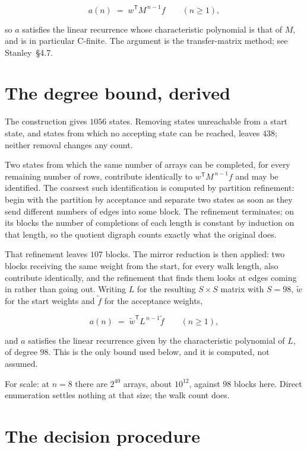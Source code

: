 \documentclass[11pt]{article}
\theoremstyle{definition}
\begin{document}
\[a(n) \;=\; w^{\mathsf T} M^{\,n-1} f \qquad (n \ge 1),\]

so $a$ satisfies the linear recurrence whose characteristic polynomial is that of $M$, and is in particular C-finite. The argument is the transfer-matrix method; see Stanley~\S4.7.

\section{The degree bound, derived}

The construction gives $1056$ states. Removing states unreachable from a start state, and states from which no accepting state can be reached, leaves $438$; neither removal changes any count.

Two states from which the same number of arrays can be completed, for every remaining number of rows, contribute identically to $w^{\mathsf T}M^{\,n-1}f$ and may be identified. The coarsest such identification is computed by partition refinement: begin with the partition by acceptance and separate two states as soon as they send different numbers of edges into some block. The refinement terminates; on its blocks the number of completions of each length is constant by induction on that length, so the quotient digraph counts exactly what the original does.

That refinement leaves $107$ blocks. The mirror reduction is then applied: two blocks receiving the same weight from the start, for every walk length, also contribute identically, and the refinement that finds them looks at edges coming in rather than going out. Writing $L$ for the resulting $S \times S$ matrix with $S = 98$, $\tilde w$ for the start weights and $\tilde f$ for the acceptance weights,

\[a(n) \;=\; \tilde w^{\mathsf T} L^{\,n-1} \tilde f \qquad (n \ge 1),\]

and $a$ satisfies the linear recurrence given by the characteristic polynomial of $L$, of degree $98$. This is the only bound used below, and it is computed, not assumed.

For scale: at $n = 8$ there are $2^{40}$ arrays, about $10^{12}$, against $98$ blocks here. Direct enumeration settles nothing at that size; the walk count does.

\section{The decision procedure}
\end{document}
